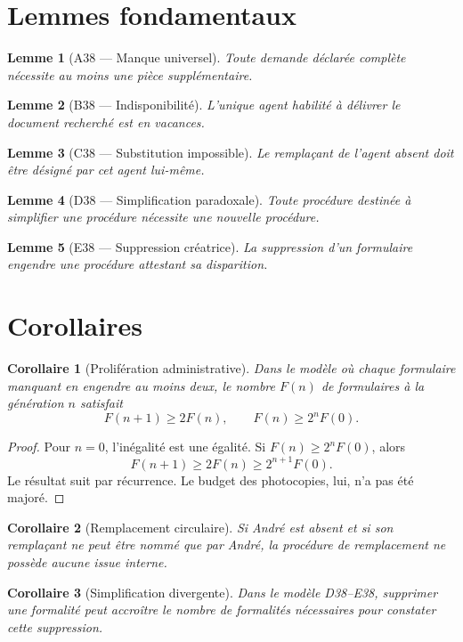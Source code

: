 \documentclass[11pt,a4paper]{article}
\newtheorem{lemme}{Lemme}
\newtheorem{corollaire}{Corollaire}
\theoremstyle{remark}\newtheorem*{remarque}{Remarque}
\begin{document}
\section{Lemmes fondamentaux}
\begin{lemme}[A38 --- Manque universel]
Toute demande déclarée complète nécessite au moins une pièce supplémentaire.
\end{lemme}
\begin{lemme}[B38 --- Indisponibilité]
L'unique agent habilité à délivrer le document recherché est en vacances.
\end{lemme}
\begin{lemme}[C38 --- Substitution impossible]
Le remplaçant de l'agent absent doit être désigné par cet agent lui-même.
\end{lemme}
\begin{lemme}[D38 --- Simplification paradoxale]
Toute procédure destinée à simplifier une procédure nécessite une nouvelle procédure.
\end{lemme}
\begin{lemme}[E38 --- Suppression créatrice]
La suppression d'un formulaire engendre une procédure attestant sa disparition.
\end{lemme}
\section{Corollaires}
\begin{corollaire}[Prolifération administrative]
Dans le modèle où chaque formulaire manquant en engendre au moins deux, le nombre $F(n)$ de formulaires à la génération $n$ satisfait
\[F(n+1)\ge 2F(n),\qquad F(n)\ge 2^n F(0).\]
\end{corollaire}
\begin{proof}
Pour $n=0$, l'inégalité est une égalité. Si $F(n)\ge 2^nF(0)$, alors
\[F(n+1)\ge 2F(n)\ge 2^{n+1}F(0).\]
Le résultat suit par récurrence. Le budget des photocopies, lui, n'a pas été majoré.
\end{proof}
\begin{corollaire}[Remplacement circulaire]
Si André est absent et si son remplaçant ne peut être nommé que par André, la procédure de remplacement ne possède aucune issue interne.
\end{corollaire}
\begin{corollaire}[Simplification divergente]
Dans le modèle D38--E38, supprimer une formalité peut accroître le nombre de formalités nécessaires pour constater cette suppression.
\end{corollaire}
\end{document}
